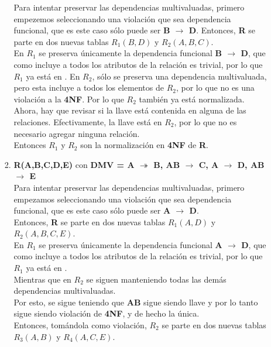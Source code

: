\documentclass{article}
\begin{document}
\begin{enumerate}
\begin{itemize}
\begin{enumerate}
    	    Para intentar preservar las dependencias multivaluadas,
    	    primero empezemos seleccionando una violación que sea
    	    dependencia funcional, que es este caso sólo puede ser 
    	    \textbf{B $\rightarrow$ D}.
    	    Entonces, \textbf{R} se parte en dos nuevas tablas
    	    $R_1(B, D)$ y $R_2(A, B, C)$.\\
    	    En $R_1$ se preserva únicamente la dependencia funcional 
    	    \textbf{B $\rightarrow$ D}, que como incluye a todos los
    	    atributos de la relación es trivial, por lo que $R_1$ ya
    	    está en .
    	    En $R_2$, sólo se preserva una dependencia multivaluada, pero
    	    esta incluye a todos los elementos de $R_2$, por lo que no es
    	    una violación a la \textbf{4NF}. Por lo que $R_2$ también ya
    	    está normalizada.\\
    	    Ahora, hay que revisar si la llave está contenida en alguna
    	    de las relaciones. Efectivamente, la llave está en $R_2$, por
    	    lo que no es necesario agregar ninguna relación.\\
    	    Entonces $R_1$ y $R_2$ son la normalización en \textbf{4NF} de
    	    \textbf{R}.
    	    \item \textbf{R(A,B,C,D,E)} con \textbf{DMV = { A $\twoheadrightarrow$ B, AB $\rightarrow$ C, A $\rightarrow$ D, AB $\rightarrow$ E}}\\
    	    Para intentar preservar las dependencias multivaluadas,
    	    primero empezamos seleccionando una violación que sea
    	    dependencia funcional, que es este caso sólo puede ser 
    	    \textbf{A $\rightarrow$ D}.\\
    	    Entonces, \textbf{R} se parte en dos nuevas tablas
    	    $R_1(A, D)$ y $R_2(A, B, C, E)$.\\
    	    En $R_1$ se preserva únicamente la dependencia funcional 
    	    \textbf{A $\rightarrow$ D}, que como incluye a todos los
    	    atributos de la relación es trivial, por lo que $R_1$ ya
    	    está en . \\
    	    Mientras que en $R_2$ se siguen manteniendo todas las demás 
    	    dependencias multivaluadas.\\
    	    Por esto, se sigue teniendo que \textbf{AB} sigue siendo llave
    	    y por lo tanto  sigue siendo
    	    violación de \textbf{4NF}, y de hecho la única.\\
    	    Entonces, tomándola como violación, $R_2$ se parte en dos
    	    nuevas tablas $R_3(A, B)$ y $R_4(A, C, E)$.\\

\end{enumerate}
\end{itemize}
\end{enumerate}
\end{document}
